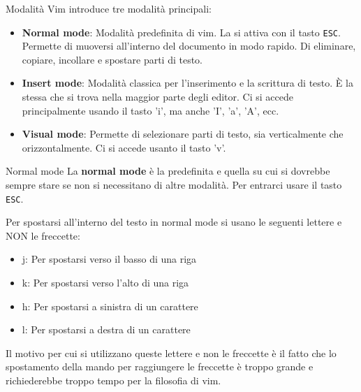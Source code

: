 \documentclass{beamer}
\begin{document}
\begin{frame}{Modalità}
  Vim introduce tre modalità principali:
  \begin{itemize}[<+->]
    \item \textbf{Normal mode}: Modalità predefinita di vim. La si attiva con 
      il tasto \texttt{ESC}. Permette di muoversi all'interno del documento in 
      modo rapido. Di eliminare, copiare, incollare e spostare parti di testo.

    \item \textbf{Insert mode}: Modalità classica per l'inserimento e la 
      scrittura di testo. È la stessa che si trova nella maggior parte degli 
      editor. Ci si accede principalmente usando il tasto 'i', ma anche 'I', 
      'a', 'A', ecc.

    \item \textbf{Visual mode}: Permette di selezionare parti di testo, sia 
      verticalmente che orizzontalmente. Ci si accede usanto il tasto 'v'.
  \end{itemize}
\end{frame}

\begin{frame}{Normal mode}
  La \textbf{normal mode} è la predefinita e quella su cui si dovrebbe sempre 
  stare se non si necessitano di altre modalità. Per entrarci usare il tasto
  \texttt{ESC}. \medskip

  Per spostarsi all'interno del testo in normal mode si usano le seguenti 
  lettere e NON le freccette:
  \begin{itemize}
    \item j: Per spostarsi verso il basso di una riga
    \item k: Per spostarsi verso l'alto di una riga
    \item h: Per spostarsi a sinistra di un carattere
    \item l: Per spostarsi a destra di un carattere
  \end{itemize}
  Il motivo per cui si utilizzano queste lettere e non le freccette è il fatto 
  che lo spostamento della mando per raggiungere le freccette è troppo grande
  e richiederebbe troppo tempo per la filosofia di vim.
\end{frame}
\end{document}
